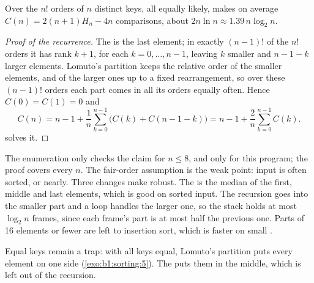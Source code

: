 \begin{theorem}\label{thm:b1:sorting:qs-average}
Over the $n!$ orders of $n$ distinct keys, all equally likely,  makes on average $C(n) = 2(n + 1)H_n - 4n$
comparisons, about $2n \ln n \approx 1.39\, n \log_2 n$.
\end{theorem}

\begin{proof}[Proof of the recurrence]
The  is the last element; in exactly $(n - 1)!$ of the $n!$ orders it has rank $k + 1$, for each $k = 0, \dots, n -
1$, leaving $k$ smaller and $n - 1 - k$ larger elements. Lomuto's partition keeps the relative order of the smaller
elements, and of the larger ones up to a fixed rearrangement, so over these $(n - 1)!$ orders each part comes in all its
orders equally often. Hence $C(0) = C(1) = 0$ and
\[ C(n) = n - 1 + \frac1n \sum_{k=0}^{n-1} \bigl(C(k) + C(n - 1 - k)\bigr) = n - 1 + \frac2n \sum_{k=0}^{n-1} C(k). \]
 solves it.
\end{proof}

\label{out:b1:sorting:qs-average}

The enumeration only checks the claim for $n \leq 8$, and only for this program; the proof covers every $n$. The
fair-order assumption is the weak point: input is often sorted, or nearly. Three changes make  robust. The
 is the median of the first, middle and last elements, which is good on sorted input. The recursion goes into the
smaller part and a loop handles the larger one, so the stack holds at most $\log_2 n$ frames, since each frame's part is
at most half the previous one. Parts of 16 elements or fewer are left to insertion sort, which is faster on small
.

\label{lst:b1:sorting:quicksort-good}

Equal keys remain a trap: with all keys equal, Lomuto's partition puts every element on one side
(\cref{exo:b1:sorting:5}). The  puts them in the middle, which is left out of the recursion.

